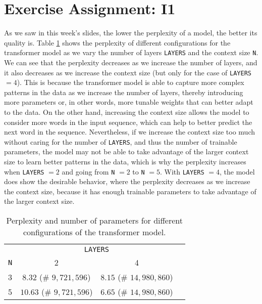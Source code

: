 \documentclass{article}
\begin{document}
\section{Exercise Assignment: I1}
As we saw in this week's slides, the lower the perplexity of a model, the better its quality is. Table \ref{tab:perplexity_and_params} shows the perplexity of different configurations for the transformer model as we vary the number of layers \texttt{LAYERS} and the context size \texttt{N}. We can see that the perplexity decreases as we increase the number of layers, and it also decreases as we increase the context size (but only for the case of \texttt{LAYERS} $= 4$). This is because the transformer model is able to capture more complex patterns in the data as we increase the number of layers, thereby introducing more parameters or, in other words, more tunable weights that can better adapt to the data. On the other hand, increasing the context size allows the model to consider more words in the input sequence, which can help to better predict the next word in the sequence. Nevertheless, if we increase the context size too much without caring for the number of \texttt{LAYERS}, and thus the number of trainable parameters, the model may not be able to take advantage of the larger context size to learn better patterns in the data, which is why the perplexity increases when \texttt{LAYERS} $= 2$ and going from  \texttt{N} $= 2$ to \texttt{N} $= 5$. With \texttt{LAYERS} $= 4$, the model does show the desirable behavior, where the perplexity decreases as we increase the context size, because it has enough trainable parameters to take advantage of the larger context size.

\begin{table}[h]
    \centering
    \caption{Perplexity and number of parameters for different configurations of the transformer model.}
    \begin{tabular}{c c c c}
        \toprule
        & \multicolumn{2}{c}{\texttt{LAYERS}} \\
        \cmidrule(lr){2-3}
        \texttt{N} & 2 & 4 \\
        \midrule
        3 & $8.32$ (\# $9{,}721{,}596$) & $8.15$ (\# $14{,}980{,}860$) \\
        5 & $10.63$ (\# $9{,}721{,}596$) & $6.65$ (\# $14{,}980{,}860$) \\
        \bottomrule
    \end{tabular}
    \label{tab:perplexity_and_params}
\end{table}
\end{document}
